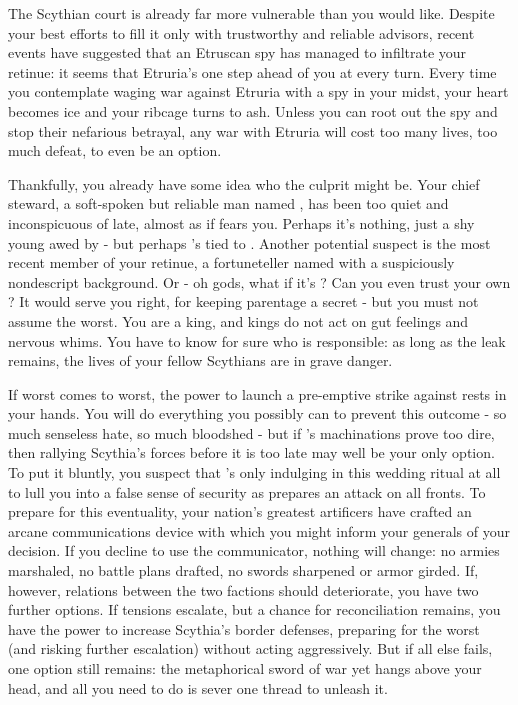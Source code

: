 \documentclass[char]{Kos}
\begin{document}
The Scythian court is already far more vulnerable than you would like. Despite your best efforts to fill it only with trustworthy and reliable advisors, recent events have suggested that an Etruscan spy has managed to infiltrate your retinue: it seems that Etruria's one step ahead of you at every turn. Every time you contemplate waging war against Etruria with a spy in your midst, your heart becomes ice and your ribcage turns to ash. Unless you can root out the spy and stop their nefarious betrayal, any war with Etruria will cost too many lives, too much defeat, to even be an option. 

Thankfully, you already have some idea who the culprit might be. Your chief steward, a soft-spoken but reliable man named \cButler{}, has been too quiet and inconspicuous of late, almost as if \cButler{\they} fears you. Perhaps it's nothing, just a shy young \cButler{\human} awed by \cButler{\their} \cScythiaKing{\monarch} - but perhaps \cButler{\they}'s tied to \cEtruriaKing{}. Another potential suspect is the most recent member of your retinue, a fortuneteller named \cBurglar{} with a suspiciously nondescript background. Or - oh gods, what if it's \cWard{}? Can you even trust your own \cWard{\offspring}? It would serve you right, for keeping \cWard{\their} parentage a secret - but you must not assume the worst. You are a king, and kings do not act on gut feelings and nervous whims. You have to know for sure who is responsible: as long as the leak remains, the lives of your fellow Scythians are in grave danger.

If worst comes to worst, the power to launch a pre-emptive strike against \cEtruriaKing{} rests in your hands. You will do everything you possibly can to prevent this outcome - so much senseless hate, so much bloodshed - but if \cEtruriaKing{}'s machinations prove too dire, then rallying Scythia's forces before it is too late may well be your only option. To put it bluntly, you suspect that \cEtruriaKing{\they}'s only indulging in this wedding ritual at all to lull you into a false sense of security as \cEtruriaKing{\they} prepares an attack on all fronts. To prepare for this eventuality, your nation's greatest artificers have crafted an arcane communications device with which you might inform your generals of your decision. If you decline to use the communicator, nothing will change: no armies marshaled, no battle plans drafted, no swords sharpened or armor girded. If, however, relations between the two factions should deteriorate, you have two further options. If tensions escalate, but a chance for reconciliation remains, you have the power to increase Scythia's border defenses, preparing for the worst (and risking further escalation) without acting aggressively. But if all else fails, one option still remains: the metaphorical sword of war yet hangs above your head, and all you need to do is sever one thread to unleash it.
\end{document}
